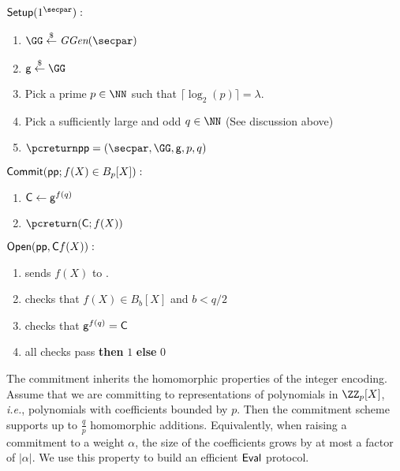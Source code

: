 \documentclass{article}
\theoremstyle{definition}
\begin{document}
\begin{mdframed}[userdefinedwidth=\textwidth]
\begin{minipage}{\textwidth}
	\begin{flushleft}
	$\pro{Setup}(1^\secpar):$
		\begin{enumerate}[nolistsep]
			\item $ \GG \sample \ggen(\secpar)$
			\item $ \gr{g} \sample \GG$
			\item Pick a prime $p\in \NN$ such that $\lceil\log_2(p)\rceil=\lambda$.
			\item Pick a sufficiently large and odd $q\in \NN$ (See discussion above)
			\item $\pcreturn \params = (\secpar,\GG,\gr{g},p,q)$
		\end{enumerate}
	$\textsf{{Commit}}(\textsf{pp};f(X) \in B_{p}[X]):$ 
		\begin{enumerate}[nolistsep]
			\item $\mathsf{C} \gets \mathsf{g}^{f(q)}$
			\item $\pcreturn (\gr{C};f(X))$
		\end{enumerate}
	$\textsf{{Open}}(\textsf{pp},\mathsf{C}f(X)):$ 
		\begin{enumerate}[nolistsep]
		    \item \prover sends $f(X)$ to \verifier.
		    \item \verifier checks that $f(X)\in B_{b}[X]$ and $b<q/2$
			\item \verifier checks that $\mathsf{g}^{f(q)} = \mathsf{C}$ 
			\item \pcif all checks pass \textbf{then} \pcreturn $1$ \textbf{else} \pcreturn $0$
		\end{enumerate}
		\end{flushleft}
\end{minipage}
\end{mdframed}
The commitment inherits the homomorphic properties of the integer encoding. Assume that we are committing to representations of polynomials in $\ZZ_p[X]$, \emph{i.e.}, polynomials with coefficients bounded by $p$. Then the commitment scheme supports up to $\frac{q}{p}$ homomorphic additions. Equivalently, when raising a commitment to a weight $\alpha$, the size of the coefficients grows by at most a factor of $|\alpha|$. We use this property to build an efficient $\textsf{{Eval}}$ protocol. 
\end{document}
